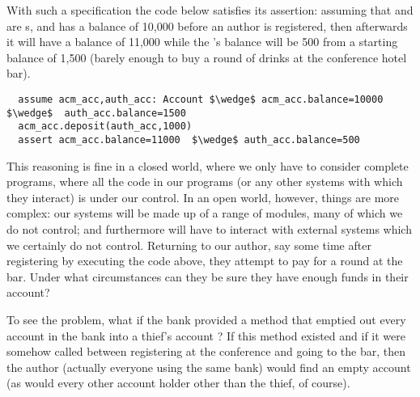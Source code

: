  


With such a specification %
the code below  satisfies its assertion: assuming that 
 and  are s, and   has a balance of 10,000 before an author is
registered, then afterwards it will have a balance of 11,000 while the
's balance  will be 500 from a starting balance of 1,500
(barely enough to buy a round of drinks at the conference hotel bar).

\begin{lstlisting}
  assume acm_acc,auth_acc: Account $\wedge$ acm_acc.balance=10000 $\wedge$  auth_acc.balance=1500
  acm_acc.deposit(auth_acc,1000)
  assert acm_acc.balance=11000  $\wedge$ auth_acc.balance=500
\end{lstlisting}

\vspace{-.2in}

This reasoning is fine in a closed world, where we only have to
consider complete programs, where all the code in our programs (or any
other systems with which they interact) is under our control.   
In an
open world, however, things are more complex: our systems will be made
up of a range of modules, many of which we do not control; and
furthermore will have to interact with external systems which we
certainly do not control.  Returning to our author, say some time
after registering by executing the  code above, they
attempt to pay for a round at the bar.  Under what circumstances can
they be sure they have enough funds in their account?

To see the problem, what if the bank provided a  method that 
 emptied out every account in the bank into a thief's account ?
If this method existed and
if it were somehow called between registering at the conference and
going to the bar, then the author (actually everyone using the same bank)
would find an empty account (as would every other account holder other than the thief, of course).
%

